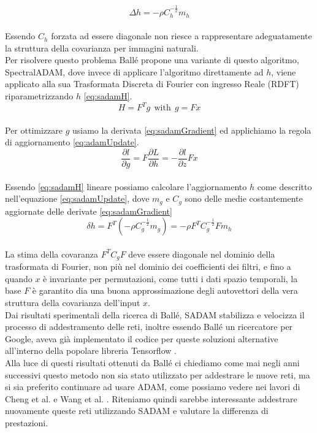 \begin{equation}\label{eq:adamUpdate}
\Delta h = - \rho C_{h}^{-\tfrac{1}{2}} m_{h}
\end{equation}\\
Essendo $C_{h}$ forzata ad essere diagonale non riesce a rappresentare adeguatamente la struttura della covarianza per immagini naturali.\\
Per risolvere questo problema Ballé propone una variante di questo algoritmo, SpectralADAM, dove invece di applicare l’algoritmo direttamente ad $h$, viene applicato alla sua Trasformata Discreta di Fourier con ingresso Reale (RDFT) riparametrizzando $h$ \ref{eq:sadamH}.\\
\begin{equation}\label{eq:sadamH}
H = F^{T} g \:\: \textrm{with} \:\: g = Fx
\end{equation}\\
Per ottimizzare $g$ usiamo la derivata \ref{eq:sadamGradient} ed applichiamo la regola di aggiornamento \ref{eq:adamUpdate}.\\
\begin{equation}\label{eq:sadamGradient}
\dfrac{\partial l}{\partial g} = F \dfrac{\partial L}{\partial h} = - \dfrac{\partial l}{\partial z} Fx
\end{equation}\\
Essendo \ref{eq:sadamH} lineare possiamo calcolare l’aggiornamento $h$ come descritto nell’equazione \ref{eq:sadamUpdate}, dove $m_{g}$ e $C_{g}$ sono delle medie costantemente aggiornate delle derivate \ref{eq:sadamGradient} \\
\begin{equation}\label{eq:sadamUpdate}
\delta h = F^{T} (-\rho C_{g}^{-\tfrac{1}{2}} m_{g}) = - \rho F^{T} C_{g}^{-\tfrac{1}{2}} Fm_{h}
\end{equation}\\
La stima della covaranza $ F^{T} C_{g} F$ deve essere diagonale nel dominio della trasformata di Fourier, non più nel dominio dei coefficienti dei filtri, e fino a quando $x$ è invariante per permutazioni, come tutti i dati spazio temporali, la base $F$ è garantito dia una buona approssimazione degli autovettori della vera struttura della covarianza dell’input $x$.\\
Dai risultati sperimentali della ricerca di Ballé, SADAM stabilizza e velocizza il processo di addestramento delle reti, inoltre essendo Ballé un ricercatore per Google, aveva già implementato il codice per queste soluzioni alternative all’interno della popolare libreria Tensorflow \cite{tensorflow2015-whitepaper}.\\
Alla luce di questi risultati ottenuti da Ballé ci chiediamo come mai negli anni successivi questo metodo non sia stato utilizzato per addestrare le nuove reti, ma si sia preferito continuare ad usare ADAM, come possiamo vedere nei lavori di Cheng et al. \cite{cheng2020learned} e Wang et al. \cite{wang2022neural}. Riteniamo quindi sarebbe interessante addestrare nuovamente queste reti utilizzando SADAM e valutare la differenza di prestazioni.


